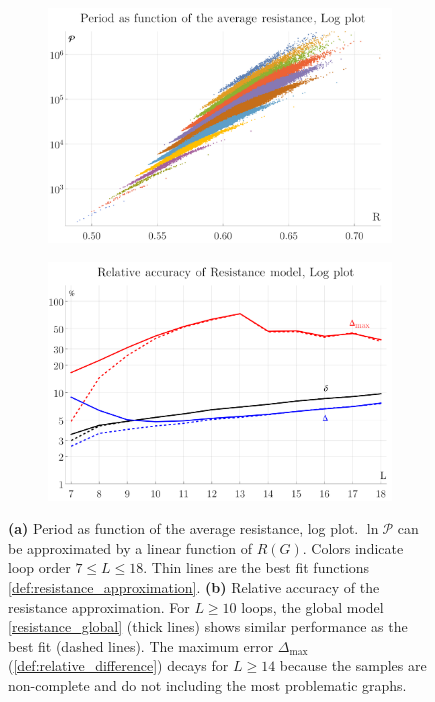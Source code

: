 \documentclass[12pt]{article}
\numberwithin{equation}{section}
\newcommand{\period}{\mathcal P}
\begin{document}
\begin{figure}[htb]
	\begin{subfigure}{ .49 \linewidth}
		\centering
		\includegraphics[width=\linewidth]{figures/resistance}
		\subcaption{}
		\label{fig:resistance_plot}
	\end{subfigure}
	\begin{subfigure}{ .49 \linewidth}
		\centering
		\includegraphics[width=\linewidth]{figures/resistance_accuracy}
		\subcaption{}
		\label{fig:resistance_accuracy}
	\end{subfigure}
	
	
	\caption{\textbf{(a)} Period as function of the average resistance, log plot.  $\ln \period$ can be approximated by a linear function of $R(G)$. Colors indicate loop order $7 \leq L \leq 18$. Thin lines are the best fit functions \cref{def:resistance_approximation}. \textbf{(b)} Relative accuracy of the resistance approximation. For $L \geq 10$ loops, the global model \cref{resistance_global} (thick lines) shows similar performance as the best fit (dashed lines). The maximum error $\Delta_\text{max}$ (\cref{def:relative_difference}) decays for $L \geq 14$ because the samples are non-complete and do not including the most problematic graphs.  }
\end{figure}
\end{document}
